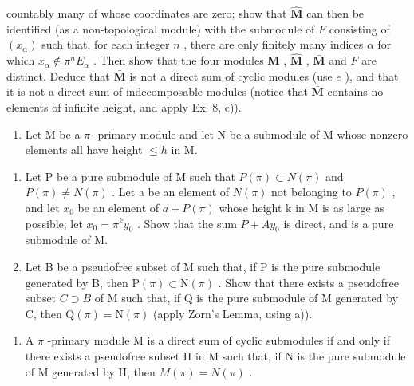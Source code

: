 countably many of whose coordinates are zero; show that \(\hat{\mathbf{M}}\) can then be identified (as a non-topological module) with the submodule of \(F\) consisting of \((x_{\alpha})\) such that, for each integer \(n\) , there are only finitely many indices \(\alpha\) for which \(x_{\alpha} \notin \pi^{n} E_{\alpha}\) . Then show that the four modules \(\mathbf{M}\) , \(\hat{\mathbf{M}}\) , \(\bar{\mathbf{M}}\) and \(F\) are distinct. Deduce that \(\bar{\mathbf{M}}\) is not a direct sum of cyclic modules (use \(e\) ), and that it is not a direct sum of indecomposable modules (notice that \(\bar{\mathbf{M}}\) contains no elements of infinite height, and apply Ex. 8, c)).

\begin{enumerate}
\def\labelenumi{\arabic{enumi})}
\setcounter{enumi}{10}
\tightlist
\item
  Let M be a \(\pi\) -primary module and let N be a submodule of M whose nonzero elements all have height \(\leqslant h\) in M.
\end{enumerate}

\begin{enumerate}
\def\labelenumi{\alph{enumi})}
\item
  Let P be a pure submodule of M such that \(P(\pi) \subset N(\pi)\) and \(P(\pi) \neq N(\pi)\) . Let a be an element of \(N(\pi)\) not belonging to \(P(\pi)\) , and let \(x_{0}\) be an element of \(a + P(\pi)\) whose height k in M is as large as possible; let \(x_{0} = \pi^{k} y_{0}\) . Show that the sum \(P + Ay_{0}\) is direct, and is a pure submodule of M.
\item
  Let B be a pseudofree subset of M such that, if P is the pure submodule generated by B, then \(\mathrm{P}(\pi) \subset \mathrm{N}(\pi)\) . Show that there exists a pseudofree subset \(C \supset B\) of M such that, if Q is the pure submodule of M generated by C, then \(\mathrm{Q}(\pi) = \mathrm{N}(\pi)\) (apply Zorn's Lemma, using a)).
\end{enumerate}

\begin{enumerate}
\def\labelenumi{\arabic{enumi})}
\setcounter{enumi}{11}
\tightlist
\item
  A \(\pi\) -primary module M is a direct sum of cyclic submodules if and only if there exists a pseudofree subset H in M such that, if N is the pure submodule of M generated by H, then \(M(\pi) = N(\pi)\) .
\end{enumerate}

